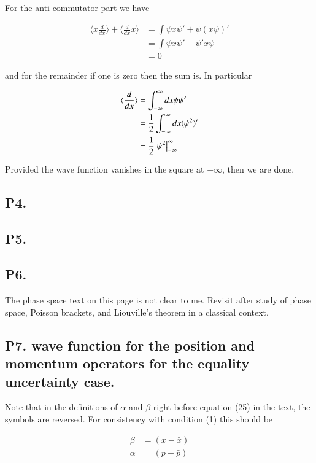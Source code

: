 \documentclass{article}
\newcommand{\expectation}[1]{\langle{#1}\rangle}
\begin{document}
For the anti-commutator part we have

\begin{align*}
\expectation{x \frac{d}{dx}} + \expectation{\frac{d}{dx} x} 
&=
\int \psi x \psi' + \psi (x \psi)' \\
&=
\int \psi x \psi' - \psi' x \psi \\
&= 0
\end{align*}

and for the remainder if one is zero then the sum is.  In particular

\begin{align*}
\expectation{\frac{d}{dx}} 
&= \int_{-\infty}^\infty dx \psi \psi' \\
&= \inv{2} \int_{-\infty}^\infty dx (\psi^2)' \\
&= \inv{2} \left. \psi^2 \right\vert_{-\infty}^\infty
\end{align*}

Provided the wave function vanishes in the square at $\pm \infty$, then we are done.

\subsection{ P4. }
\subsection{ P5. }
\subsection{ P6. }

The phase space text on this page is not clear to me.  Revisit after study
of phase space, Poisson brackets, and Liouville's theorem in a classical
context.

\subsection{ P7. wave function for the position and momentum operators for the equality uncertainty case. }

Note that in the definitions of $\alpha$ and $\beta$ right before equation (25) in the text, the symbols are reversed.  For consistency with condition (1)
this should be

\begin{align*}
\beta &= (x - \bar{x}) \\
\alpha &= (p - \bar{p})
\end{align*}
\end{document}
